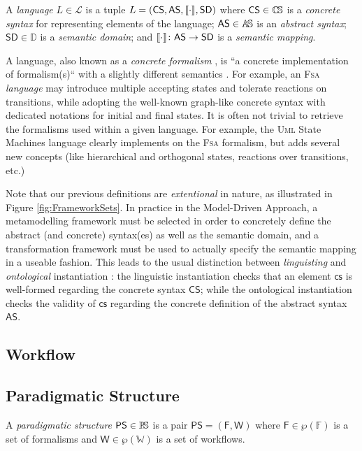  \begin{Definition}[Language]
   A \emph{language} $L\in\mathcal{L}$ is a tuple $L = (\mathsf{CS}, 
\mathsf{AS}, \llbracket \cdot \rrbracket , \mathsf{SD})$ where $\mathsf{CS}\in\mathbb{C}\!\mathbb{S}$ is a 
\emph{concrete syntax} for representing elements of the language;  
$\mathsf{AS}\in\mathbb{A}\!\mathbb{S}$ is an \emph{abstract syntax}; $\mathsf{SD}\in\mathbb{D}$ is 
a \emph{semantic domain}; and $\llbracket \cdot \rrbracket  \colon \mathsf{AS} \to \mathsf{SD}$ is 
a \emph{semantic mapping}. 
\end{Definition}
A language, also known as a \emph{concrete formalism} \cite{P:MPM:2006}, is ``a 
concrete implementation of formalism(s)`` with a slightly different semantics  
\cite{Broman-etAl:2012}. For example, an \textsc{Fsa} \emph{language} may 
introduce multiple accepting states and tolerate reactions on transitions, 
while adopting the well-known graph-like concrete syntax with dedicated 
notations for initial and final states. It is often not trivial to retrieve the 
formalisms used within a given language. For example, the \textsc{Uml} State 
Machines language clearly implements on the \textsc{Fsa} formalism, but adds 
several new concepts (like hierarchical and orthogonal states, reactions over 
transitions, etc.)

Note that our previous definitions are \emph{extentional} in nature, as 
illustrated in Figure \ref{fig:FrameworkSets}. In practice in the Model-Driven 
Approach, a metamodelling framework must be selected in order to concretely 
define the abstract (and concrete) syntax(es) as well as the semantic domain, 
and a transformation framework must be used to actually specify the semantic 
mapping in a useable fashion. This leads to the usual distinction between 
\emph{linguisting} and \emph{ontological} instantiation \cite{J:Kuhne:2006}: the 
linguistic instantiation checks that an element $\mathsf{cs}$ is well-formed 
regarding the concrete syntax $\mathsf{CS}$; while the ontological 
instantiation checks the validity of $\mathsf{cs}$ regarding the concrete 
definition of the abstract syntax $\mathsf{AS}$.


\subsection{Workflow}
\label{sec:Workflow}


\subsection{Paradigmatic Structure}
\label{sec:PS}

\begin{Definition}
   A \emph{paradigmatic structure} $\mathsf{PS}\in \mathbb{P}\!\mathbb{S}$ is a pair $\mathsf{PS} 
= (\mathsf{F}, \mathsf{W})$ where $\mathsf{F}\in \wp(\mathbb{F})$ is a set of 
formalisms and $\mathsf{W}\in\wp(\mathbb{W})$ is a set of workflows.
\end{Definition}

